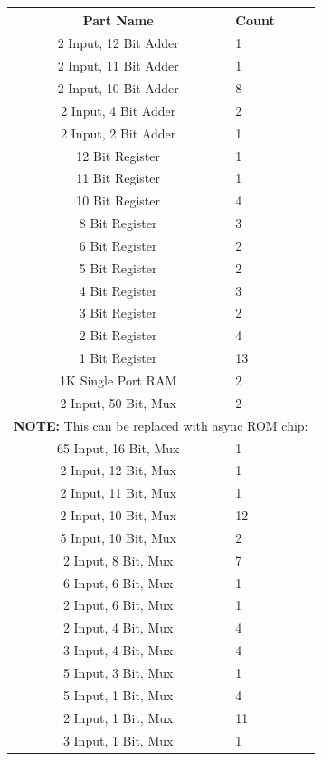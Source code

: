 \documentclass[12pt]{article}
\begin{document}
\newpage
\begin{center}
\begin{tabular}{ ||c|l|| }
    \hline
    Part Name & Count \\
    \hline
        2 Input, 12 Bit Adder & 1 \\ 
        2 Input, 11 Bit Adder & 1 \\  
        2 Input, 10 Bit Adder & 8 \\  
        2 Input,  4 Bit Adder & 2 \\  
        2 Input,  2 Bit Adder & 1 \\
        \hline
        12 Bit Register & 1 \\
        11 Bit Register & 1 \\  
        10 Bit Register & 4 \\
        8 Bit Register & 3 \\
        6 Bit Register & 2 \\
        5 Bit Register & 2 \\
        4 Bit Register & 3 \\  
        3 Bit Register & 2 \\
        2 Bit Register & 4 \\
        1 Bit Register & 13 \\
        \hline
        1K Single Port RAM & 2 \\
        \hline
        2 Input,      50 Bit,        Mux & 2 \\
        \multicolumn{2}{||c||}{\textbf{NOTE:} This can be replaced with async ROM chip:} \\
        65 Input,     16 Bit,        Mux & 1     \\ 
         2 Input,     12 Bit,        Mux & 1     \\
         2 Input,     11 Bit,        Mux & 1     \\
         2 Input,     10 Bit,        Mux & 12    \\
         5 Input,     10 Bit,        Mux & 2     \\
         2 Input,      8 Bit,        Mux & 7     \\
         6 Input,      6 Bit,        Mux & 1     \\
         2 Input,      6 Bit,        Mux & 1     \\
         2 Input,      4 Bit,        Mux & 4     \\
         3 Input,      4 Bit,        Mux & 4     \\
         5 Input,      3 Bit,        Mux & 1     \\
         5 Input,      1 Bit,        Mux & 4     \\
         2 Input,      1 Bit,        Mux & 11    \\
         3 Input,      1 Bit,        Mux & 1  \\
    \hline
\end{tabular}
\end{center}
\end{document}
